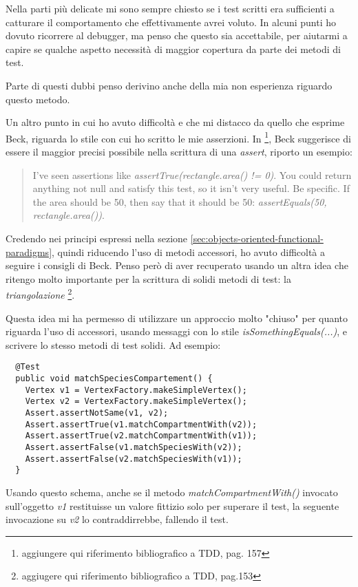 Nella parti pi\`u delicate mi sono sempre chiesto se i test scritti
era sufficienti a catturare il comportamento che effettivamente avrei
voluto. In alcuni punti ho dovuto ricorrere al debugger, ma penso che
questo sia accettabile, per aiutarmi a capire se qualche aspetto
necessit\`a di maggior copertura da parte dei metodi di test.

Parte di questi dubbi penso derivino anche della mia non esperienza
riguardo questo metodo.

Un altro punto in cui ho avuto difficolt\`a e che mi distacco da
quello che esprime Beck, riguarda lo stile con cui ho scritto le mie
asserzioni. In \footnote{aggiungere qui riferimento bibliografico a
  TDD, pag. 157}, Beck suggerisce di essere il maggior precisi
possibile nella scrittura di una \emph{assert}, riporto un esempio:
\begin{quotation}
  I've seen assertions like \emph{assertTrue(rectangle.area() !=
    0)}. You could return anything not null and satisfy this test, so
  it isn't very useful. Be specific. If the area should be 50, then
  say that it should be 50: \emph{assertEquals(50, rectangle.area())}.
\end{quotation}
Credendo nei principi espressi nella sezione
\ref{sec:objects-oriented-functional-paradigms}, quindi riducendo
l'uso di metodi accessori, ho avuto difficolt\`a a seguire i consigli
di Beck. Penso per\`o di aver recuperato usando un altra idea che
ritengo molto importante per la scrittura di solidi metodi di test: la
\emph{triangolazione} \footnote{aggiugere qui riferimento
  bibliografico a TDD, pag.153}. 

Questa idea mi ha permesso di utilizzare un approccio molto "chiuso"
per quanto riguarda l'uso di accessori, usando messaggi con lo
stile \emph{isSomethingEquals(...)}, e scrivere lo stesso metodi di
test solidi. Ad esempio:
\begin{lstlisting}
  @Test
  public void matchSpeciesCompartement() {
    Vertex v1 = VertexFactory.makeSimpleVertex();
    Vertex v2 = VertexFactory.makeSimpleVertex();
    Assert.assertNotSame(v1, v2);
    Assert.assertTrue(v1.matchCompartmentWith(v2));
    Assert.assertTrue(v2.matchCompartmentWith(v1));
    Assert.assertFalse(v1.matchSpeciesWith(v2));
    Assert.assertFalse(v2.matchSpeciesWith(v1));
  }
\end{lstlisting}
Usando questo schema, anche se il metodo \emph{matchCompartmentWith()}
invocato sull'oggetto \emph{v1} restituisse un valore fittizio solo
per superare il test, la seguente invocazione su \emph{v2} lo
contraddirrebbe, fallendo il test.
